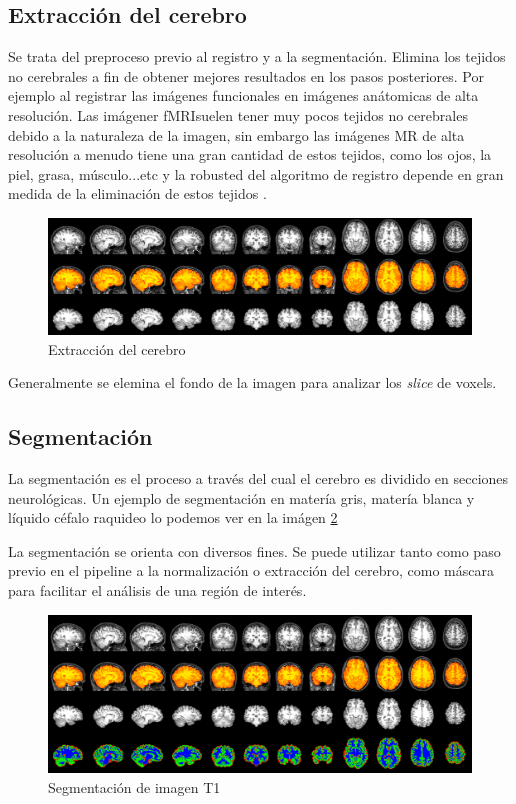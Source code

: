 \subsection{Extracción del cerebro}

Se trata del preproceso previo al registro y a la segmentación. Elimina los tejidos no cerebrales a fin de obtener mejores resultados en los pasos posteriores. Por ejemplo al registrar las imágenes funcionales en imágenes anátomicas de alta resolución. Las imágener fMRIsuelen tener muy pocos tejidos no cerebrales debido a la naturaleza de la imagen, sin embargo las imágenes MR de alta resolución a menudo tiene una gran cantidad de estos tejidos, como los ojos, la piel, grasa, músculo...etc y la robusted del algoritmo de registro depende en gran medida de la eliminación de estos tejidos \cite{bet}.

\begin{figure}[H]
  \centering
    \includegraphics[scale=0.5]{img/skull_strip.png}
  \caption{Extracción del cerebro}         \label{preproc:skull_strip}
\end{figure}

Generalmente se elemina el fondo de la imagen para analizar los \textit{slice} de voxels.

\subsection{Segmentación}

La segmentación es el proceso a través del cual el cerebro es dividido en secciones neurológicas. Un ejemplo de segmentación en matería gris, matería blanca y líquido céfalo raquideo lo podemos ver en la imágen \ref{preproc:segmen}

La segmentación se orienta con diversos fines. Se puede utilizar tanto como paso previo en el pipeline a la normalización o extracción del cerebro, como máscara para facilitar el análisis de una región de interés.
 
\begin{figure}[H]
  \centering
    \includegraphics[scale=0.5]{img/segmentation.png}
  \caption{Segmentación de imagen T1}         \label{preproc:segmen}
\end{figure}

